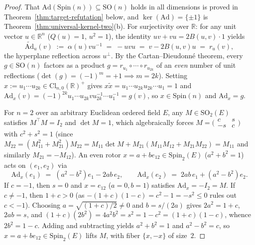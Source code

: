 \documentclass[11pt]{article}
\theoremstyle{definition}
\theoremstyle{remark}
\newcommand{\Cl}{\mathrm{Cl}}
\newcommand{\Spin}{\mathrm{Spin}}
\newcommand{\Ad}{\mathrm{Ad}}
\newcommand{\tAd}{\widetilde{\mathrm{Ad}}}
\newcommand{\SO}{\mathrm{SO}}
\begin{document}
\begin{proof}
That $\Ad(\Spin(n)) \subseteq \SO(n)$ holds in all dimensions is proved in Theorem~\ref{thm:target-refutation} below, and $\ker(\Ad) = \{\pm 1\}$ is Theorem~\ref{thm:universal-kernel-two}(b). For surjectivity over $\mathbb{R}$: for any unit vector $u \in \mathbb{R}^n$ ($Q(u) = 1$, $u^2 = 1$), the identity $u v + v u = 2 B(u,v) \cdot 1$ yields
\[
\tAd_u(v) \;:=\; \alpha(u) v u^{-1} \;=\; -u v u \;=\; v - 2 B(u,v) u \;=\; r_u(v),
\]
the hyperplane reflection across $u^\perp$. By the Cartan--Dieudonn\'e theorem, every $g \in \SO(n)$ factors as a product $g = r_{u_1} \circ \cdots \circ r_{u_{2k}}$ of an \emph{even} number of unit reflections ($\det(g) = (-1)^m = +1 \implies m = 2k$). Setting $x := u_1 \cdots u_{2k} \in \Cl_{n,0}(\mathbb{R})^+$ gives $x \widetilde{x} = u_1 \cdots u_{2k} u_{2k} \cdots u_1 = 1$ and $\Ad_x(v) = (-1)^{2k} u_1 \cdots u_{2k} v u_{2k}^{-1} \cdots u_1^{-1} = g(v)$, so $x \in \Spin(n)$ and $\Ad_x = g$.

For $n = 2$ over an arbitrary Euclidean ordered field $E$, any $M \in \SO_2(E)$ satisfies $M^\top M = I_2$ and $\det M = 1$, which algebraically forces $M = \bigl(\begin{smallmatrix} c & s \\ -s & c \end{smallmatrix}\bigr)$ with $c^2 + s^2 = 1$ (since $M_{22} = (M_{11}^2 + M_{21}^2) M_{22} = M_{11} \det M + M_{21}(M_{11} M_{12} + M_{21} M_{22}) = M_{11}$ and similarly $M_{21} = -M_{12}$). An even rotor $x = a + b e_{12} \in \Spin_2(E)$ ($a^2 + b^2 = 1$) acts on $(e_1, e_2)$ via
\[
\Ad_x(e_1) \;=\; (a^2 - b^2) e_1 - 2ab\, e_2, \qquad \Ad_x(e_2) \;=\; 2ab\, e_1 + (a^2 - b^2) e_2.
\]
If $c = -1$, then $s = 0$ and $x = e_{12}$ ($a = 0, b = 1$) satisfies $\Ad_x = -I_2 = M$. If $c \ne -1$, then $1 + c > 0$ (as $-(1+c)(1-c) = c^2 - 1 = -s^2 \le 0$ rules out $c < -1$). Choosing $a = \sqrt{(1+c)/2} \ne 0$ and $b = s / (2a)$ gives $2a^2 = 1 + c$, $2ab = s$, and $(1+c)(2b^2) = 4a^2 b^2 = s^2 = 1 - c^2 = (1+c)(1-c)$, whence $2b^2 = 1 - c$. Adding and subtracting yields $a^2 + b^2 = 1$ and $a^2 - b^2 = c$, so $x = a + b e_{12} \in \Spin_2(E)$ lifts $M$, with fiber $\{x, -x\}$ of size~$2$.
\end{proof}
\end{document}
